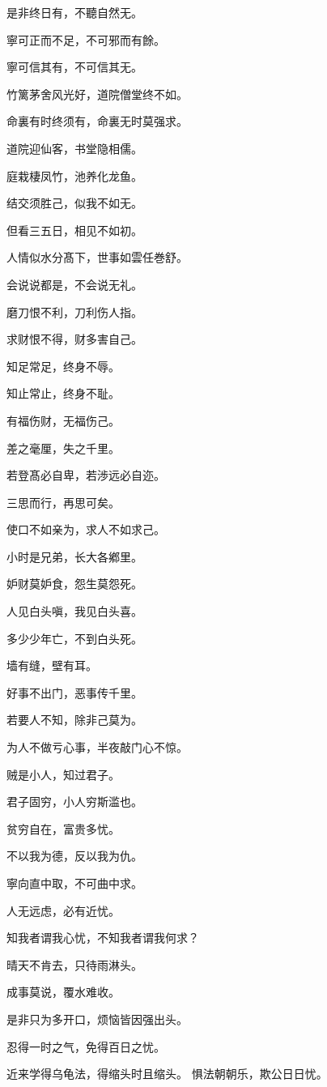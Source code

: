 \documentclass[12pt,oneside]{book}
\begin{document}
是非终日有，不聽自然无。

寧可正而不足，不可邪而有餘。

寧可信其有，不可信其无。

竹篱茅舍风光好，道院僧堂终不如。

命裏有时终须有，命裏无时莫强求。

道院迎仙客，书堂隐相儒。

庭栽棲凤竹，池养化龙鱼。

结交须胜己，似我不如无。

但看三五日，相见不如初。

人情似水分髙下，世事如雲任巻舒。

会说说都是，不会说无礼。

磨刀恨不利，刀利伤人指。

求财恨不得，财多害自己。

知足常足，终身不辱。

知止常止，终身不耻。

有福伤财，无福伤己。

差之毫厘，失之千里。

若登髙必自卑，若渉远必自迩。

三思而行，再思可矣。

使口不如亲为，求人不如求己。

小时是兄弟，长大各鄕里。

妒财莫妒食，怨生莫怨死。

人见白头嗔，我见白头喜。

多少少年亡，不到白头死。

墙有缝，壁有耳。

好事不出门，恶事传千里。

若要人不知，除非己莫为。

为人不做亏心事，半夜敲门心不惊。

贼是小人，知过君子。

君子固穷，小人穷斯滥也。

贫穷自在，富贵多忧。

不以我为德，反以我为仇。

寧向直中取，不可曲中求。

人无远虑，必有近忧。

知我者谓我心忧，不知我者谓我何求？

晴天不肯去，只待雨淋头。

成事莫说，覆水难收。

是非只为多开口，烦恼皆因强出头。

忍得一时之气，免得百日之忧。

近来学得乌龟法，得缩头时且缩头。
惧法朝朝乐，欺公日日忧。
\end{document}
